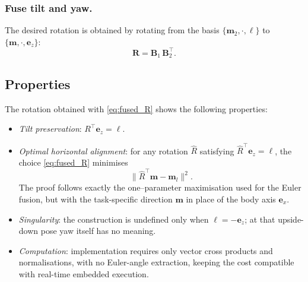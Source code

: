 \documentclass{IJCAS}
\begin{document}
\subsubsection{ Fuse tilt and yaw.}
The desired rotation is obtained by rotating from the basis
$\{\boldsymbol{m}_{2},\cdot,\boldsymbol{\ell}\}$ to
$\{\boldsymbol{m},\cdot,\boldsymbol{e}_{z}\}$:
\begin{equation}
  \boldsymbol{R} = \boldsymbol{B}_{1}\,\boldsymbol{B}_{2}^{\top}.
  \label{eq:fused_R}
\end{equation}



\subsection{Properties}

The rotation obtained with \eqref{eq:fused_R} shows the following
properties:

\begin{itemize}
  \item \emph{Tilt preservation}:  
        \(R^{\top}\boldsymbol{e}_{z}=\boldsymbol{\ell}\).

  \item \emph{Optimal horizontal alignment}:  
        for any rotation \(\hat R\) satisfying
        \(\hat R^{\top}\boldsymbol{e}_{z}=\boldsymbol{\ell}\),
        the choice \eqref{eq:fused_R} minimises
        \[
          \bigl\|
             \hat R^{\top}\boldsymbol{m}-\boldsymbol{m}_{l}
          \bigr\|^{2}.
        \]
        The proof follows exactly the one–parameter maximisation used
        for the Euler fusion, but with the task-specific direction
        \(\boldsymbol{m}\) in place of the body axis
        \(\boldsymbol{e}_{x}\).

  \item \emph{Singularity}:  
        the construction is undefined only when
        \(\boldsymbol{\ell}=-\boldsymbol{e}_{z}\); at that upside-down
        pose yaw itself has no meaning.

  \item \emph{Computation}:  
        implementation requires only vector cross products and
        normalisations, with no Euler-angle extraction, keeping the cost
        compatible with real-time embedded execution.
\end{itemize}
\end{document}
